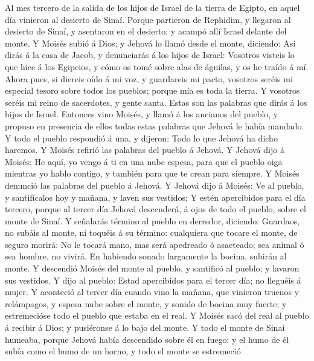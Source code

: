  Al mes tercero de la salida de los hijos de Israel de la
tierra de Egipto, en aquel día vinieron al desierto de Sinaí.
 Porque partieron de Rephidim, y llegaron al desierto de
Sinaí, y asentaron en el desierto; y acampó allí Israel delante del
monte.  Y Moisés subió á Dios; y Jehová lo llamó desde el
monte, diciendo: Así dirás á la casa de Jacob, y denunciarás á los hijos
de Israel:  Vosotros visteis lo que hice á los Egipcios, y
cómo os tomé sobre alas de águilas, y os he traído á mí. 
Ahora pues, si diereis oído á mi voz, y guardareis mi pacto, vosotros
seréis mi especial tesoro sobre todos los pueblos; porque mía es toda la
tierra.  Y vosotros seréis mi reino de sacerdotes, y gente
santa. Estas son las palabras que dirás á los hijos de Israel.
 Entonces vino Moisés, y llamó á los ancianos del pueblo, y
propuso en presencia de ellos todas estas palabras que Jehová le había
mandado.  Y todo el pueblo respondió á una, y dijeron: Todo
lo que Jehová ha dicho haremos. Y Moisés refirió las palabras del pueblo
á Jehová.  Y Jehová dijo á Moisés: He aquí, yo vengo á ti en
una nube espesa, para que el pueblo oiga mientras yo hablo contigo, y
también para que te crean para siempre. Y Moisés denunció las palabras
del pueblo á Jehová.  Y Jehová dijo á Moisés: Ve al pueblo,
y santifícalos hoy y mañana, y laven sus vestidos;  Y estén
apercibidos para el día tercero, porque al tercer día Jehová descenderá,
á ojos de todo el pueblo, sobre el monte de Sinaí.  Y
señalarás término al pueblo en derredor, diciendo: Guardaos, no subáis
al monte, ni toquéis á su término: cualquiera que tocare el monte, de
seguro morirá:  No le tocará mano, mas será apedreado ó
asaeteado; sea animal ó sea hombre, no vivirá. En habiendo sonado
largamente la bocina, subirán al monte.  Y descendió Moisés
del monte al pueblo, y santificó al pueblo; y lavaron sus vestidos.
 Y dijo al pueblo: Estad apercibidos para el tercer día; no
lleguéis á mujer.  Y aconteció al tercer día cuando vino la
mañana, que vinieron truenos y relámpagos, y espesa nube sobre el monte,
y sonido de bocina muy fuerte; y estremecióse todo el pueblo que estaba
en el real.  Y Moisés sacó del real al pueblo á recibir á
Dios; y pusiéronse á lo bajo del monte.  Y todo el monte de
Sinaí humeaba, porque Jehová había descendido sobre él en fuego: y el
humo de él subía como el humo de un horno, y todo el monte se estremeció
